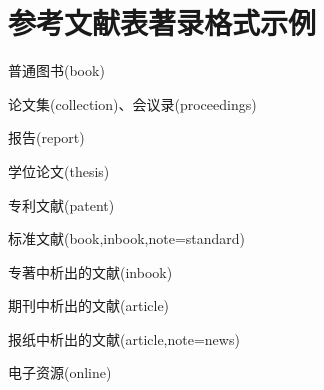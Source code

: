 \documentclass[11pt]{article} %
\begin{document}
\section{参考文献表著录格式示例}\label{sec:eg:gb77142015}
\begin{refsection}
普通图书(book)
\cite{张伯伟2002--}
\cite{2009-155-155}
\cite{胡承正2010-112-112}
\cite{美国妇产科医师学会2010-38-39}
\cite{1962-50-50}
\cite{汪昂1881--}
\cite{蒋有绪1998--}
\cite{中国企业投资协会2013--}
\cite{罗斯基2009--}
\cite{库恩2012--}
\cite{候文顺2010-119-119}
\cite{CRAWFPRD1995--}
\cite{IFLAI1977--}
\cite{OBRIEN1994--}
\cite{Kinchy2012-50-50}
\cite{Praetzellis2011-13-13}

论文集(collection)、会议录(proceedings)
\cite{中国职工教育研究会1985--}
\cite{中国社会科学院台湾史研究中心2012--}
\cite{雷光春2012--}
\cite{陈志勇2011--}
\cite{Babu2014--}

报告(report)
\cite{中华人民共和国国务院新闻办公室2013-04-16--}
\cite{汤万金2013-09-30--}
\cite{Calkin2011-8-9}
\cite{DTFHA1990--}
\cite{WHO1970--}

学位论文(thesis)
\cite{马欢2011-27-27}
\cite{吴云芳2003--}
\cite{CALMS1965--}

专利文献(patent)
\cite{张凯军2012-04-05--}
\cite{河北绿洲生态环境科技有限公司2001--}
\cite{KOSEKI2002--}

标准文献(book,inbook,note=standard)
\cite{全国信息文献标准化技术委员会2010-3-3}
\cite{全国广播电视标准化技术委员会2007-1-1}
\cite{国家环境保护局科技标准司1996-2-3}
\cite{standardinfoiso158}

专著中析出的文献(inbook)
\cite{1988-590-590}
\cite{白书农1998-146-163}
\cite{汪学军2002-22-25}
\cite{国家标准局信息分类编码研究所1988-59-92}
\cite{1977-49-49}
\cite{楼梦麟2011-11-12}
\cite{BUSECK1980-117-211}
\cite{FOURNEY1971-17-38}

期刊中析出的文献(article)
\cite{杨洪升2013-56-75}
\cite{李炳穆2000-5-8}
\cite{于潇2012-1518-1523}
\cite{陈建军2010-93-93}
\cite{DESMARAIS1992-605-609}
\cite{Saito2006-169-176}
\cite{Walls2013-399-418}
\cite{Franz2013-1053-1062}
\cite{Park2010-696-715}

报纸中析出的文献(article,note=news)
\cite{丁文祥2000--}
\cite{张田勤2000--}
\cite{傅刚2000--}
\cite{刘裕国2013-01-12--}

电子资源(online)
\cite{萧钰2001--}
\cite{李强2012-05-03--}
\cite{Commonwealth--}
\cite{Dublin2012-06-14--}



\end{refsection}
\end{document}
